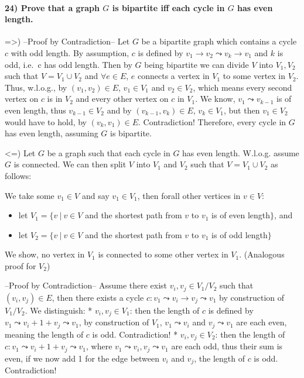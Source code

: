 \documentclass[
]{article}
\providecommand{\tightlist}{%
  \setlength{\itemsep}{0pt}\setlength{\parskip}{0pt}}
\begin{document}
\hypertarget{prove-that-a-graph-g-is-bipartite-iff-each-cycle-in-g-has-even-length.}{%
\paragraph{\texorpdfstring{24) Prove that a graph \(G\) is bipartite iff
each cycle in \(G\) has even
length.}{24) Prove that a graph G is bipartite iff each cycle in G has even length.}}\label{prove-that-a-graph-g-is-bipartite-iff-each-cycle-in-g-has-even-length.}}

=\textgreater) --Proof by Contradiction-- Let \(G\) be a bipartite graph
which contains a cycle \(c\) with odd length. By assumption, \(c\) is
defined by \(v_1 \rightarrow v_2 \leadsto v_k \rightarrow v_1\) and
\(k\) is odd, i.e.~c has odd length. Then by \(G\) being bipartite we
can divide \(V\) into \(V_1,V_2\) such that \(V = V_1 \cup V_2\) and
\(\forall e \in E\), \(e\) connects a vertex in \(V_1\) to some vertex
in \(V_2\). Thus, w.l.o.g., by \((v_1,v_2) \in E\), \(v_1 \in V_1\) and
\(v_2 \in V_2\), which means every second vertex on \(c\) is in \(V_2\)
and every other vertex on \(c\) in \(V_1\). We know,
\(v_1 \leadsto v_{k-1}\) is of even length, thus \(v_{k-1} \in V_2\) and
by \((v_{k-1}, v_k) \in E\), \(v_k \in V_1\), but then \(v_1 \in V_2\)
would have to hold, by \((v_k,v_1) \in E\). Contradiction! Therefore,
every cycle in \(G\) has even length, assuming \(G\) is bipartite.

\textless=) Let \(G\) be a graph such that each cycle in \(G\) has even
length. W.l.o.g. assume \(G\) is connected. We can then split \(V\) into
\(V_1\) and \(V_2\) such that \(V = V_1 \cup V_2\) as follows:

We take some \(v_1 \in V\) and say \(v_1 \in V_1\), then forall other
vertices in \(v \in V\):

\begin{itemize}
\tightlist
\item
  let \(V_1 = \{v \ | \ v \in V\) and the shortest path from \(v\) to
  \(v_1\) is of even length\(\}\), and
\item
  let \(V_2 = \{v \ | \ v \in V\) and the shortest path from \(v\) to
  \(v_1\) is of odd length\(\}\)
\end{itemize}

We show, no vertex in \(V_1\) is connected to some other vertex in
\(V_1\). (Analogous proof for \(V_2\))

--Proof by Contradiction-- Assume there exist \(v_i,v_j \in V_1/V_2\)
such that \((v_i,v_j) \in E\), then there exists a cycle
\(c: v_1 \leadsto v_i \rightarrow v_j \leadsto v_1\) by construction of
\(V_1/V_2\). We distinguish: * \(v_i,v_j \in V_1\): then the length of
\(c\) is defined by \(v_1 \leadsto v_i + 1 + v_j \leadsto v_1\), by
construction of \(V_1\), \(v_1 \leadsto v_i\) and \(v_j \leadsto v_1\)
are each even, meaning the length of \(c\) is odd. Contradiction! *
\(v_i, v_j \in V_2\): then the length of
\(c: v_1 \leadsto v_i + 1 + v_j \leadsto v_1\), where
\(v_1 \leadsto v_i, v_j \leadsto v_1\) are each odd, thus their sum is
even, if we now add 1 for the edge between \(v_i\) and \(v_j\), the
length of \(c\) is odd. Contradiction!
\end{document}
